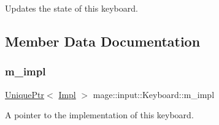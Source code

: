 Updates the state of this keyboard. 

\subsection{Member Data Documentation}
\hypertarget{classmage_1_1input_1_1_keyboard_af693bedd8a7bc9ca0d1c130b84753f67}{}\label{classmage_1_1input_1_1_keyboard_af693bedd8a7bc9ca0d1c130b84753f67} 
\subsubsection{\texorpdfstring{m\+\_\+impl}{m\_impl}}
{\footnotesize\ttfamily \hyperlink{namespacemage_a3316d7143a973e37adf1110f2e80ca31}{Unique\+Ptr}$<$ \hyperlink{classmage_1_1input_1_1_keyboard_1_1_impl}{Impl} $>$ mage\+::input\+::\+Keyboard\+::m\+\_\+impl\hspace{0.3cm}{\ttfamily [private]}}

A pointer to the implementation of this keyboard. 